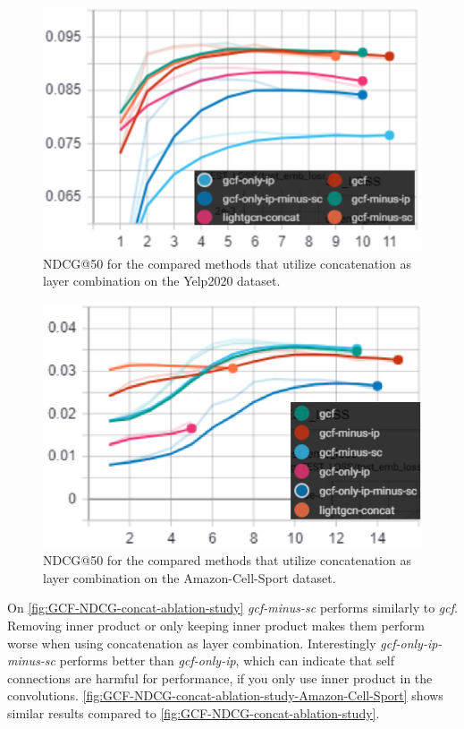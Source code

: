 \begin{figure}[h!]
    \includegraphics[width=\linewidth]{figures/gcf-ndcg-concat.png}
    \caption{NDCG@50 for the compared methods that utilize concatenation as layer combination on the Yelp2020 dataset.}
    \label{fig:GCF-NDCG-concat-ablation-study}
\end{figure}
\begin{figure}[h!]
    \includegraphics[width=\linewidth]{figures/amazon-cell-sport-gcf-ndcg.png}
    \caption{NDCG@50 for the compared methods that utilize concatenation as layer combination on the Amazon-Cell-Sport dataset.}
    \label{fig:GCF-NDCG-concat-ablation-study-Amazon-Cell-Sport}
\end{figure}
On \autoref{fig:GCF-NDCG-concat-ablation-study} \textit{gcf-minus-sc} performs similarly to \textit{gcf}.
Removing inner product or only keeping inner product makes them perform worse when using concatenation as layer combination.
Interestingly \textit{gcf-only-ip-minus-sc} performs better than \textit{gcf-only-ip}, which can indicate that self connections are harmful for performance, if you only use inner product in the convolutions.
\autoref{fig:GCF-NDCG-concat-ablation-study-Amazon-Cell-Sport} shows similar results compared to \autoref{fig:GCF-NDCG-concat-ablation-study}.
